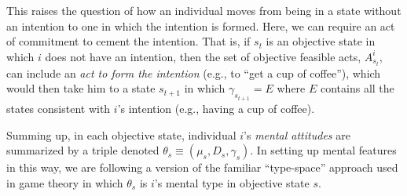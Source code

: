 \documentclass[
11pt,
titlepage,
reqno,
]{article}%
\theoremstyle{definition}
\begin{document}
This raises the question of how an individual moves from being in a state without an intention to one in which the intention is formed. 
Here, we can require an act of commitment to cement the intention. 
That is, if $s_t$ is an objective state in which $i$ does not have an intention, then the set of objective feasible acts, $A^i_{s_t}$, can include an \textit{act to form the intention} (e.g., to ``get a cup of coffee''), which would then take him to a state $s_{t+1}$ in which $\gamma_{s_{t+1}}=E$ where $E$ contains all the states consistent with $i$'s intention (e.g., having a cup of coffee).
	
Summing up, in each objective state, individual $i$'s \textit{mental attitudes} are summarized by a triple denoted $\theta_s\equiv(\mu_s,D_s,\gamma_s)$.
In setting up mental features in this way, we are following a version of the familiar ``type-space'' approach used in game theory \citep[See][]{Harsanyi1967, Mertens1985a} in which $\theta_s$ is $i$'s mental type in objective state $s$. 
	
	
	




\pagebreak
\end{document}
